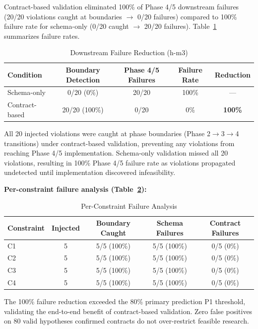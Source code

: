Contract-based validation eliminated 100\% of Phase 4/5 downstream failures (20/20 violations caught at boundaries $\rightarrow$ 0/20 failures) compared to 100\% failure rate for schema-only (0/20 caught $\rightarrow$ 20/20 failures). Table~\ref{tab:failure_reduction} summarizes failure rates.

\begin{table}[h]
\centering
\caption{Downstream Failure Reduction (h-m3)}
\label{tab:failure_reduction}
\begin{tabular}{lcccc}
\toprule
Condition & Boundary Detection & Phase 4/5 Failures & Failure Rate & Reduction \\
\midrule
Schema-only & 0/20 (0\%) & 20/20 & 100\% & --- \\
Contract-based & 20/20 (100\%) & 0/20 & 0\% & \textbf{100\%} \\
\bottomrule
\end{tabular}
\end{table}

All 20 injected violations were caught at phase boundaries (Phase 2$\rightarrow$3$\rightarrow$4 transitions) under contract-based validation, preventing any violations from reaching Phase 4/5 implementation. Schema-only validation missed all 20 violations, resulting in 100\% Phase 4/5 failure rate as violations propagated undetected until implementation discovered infeasibility.

\textbf{Per-constraint failure analysis (Table~\ref{tab:per_constraint_failure}):}

\begin{table}[h]
\centering
\caption{Per-Constraint Failure Analysis}
\label{tab:per_constraint_failure}
\begin{tabular}{lcccc}
\toprule
Constraint & Injected & Boundary Caught & Schema Failures & Contract Failures \\
\midrule
C1 & 5 & 5/5 (100\%) & 5/5 (100\%) & 0/5 (0\%) \\
C2 & 5 & 5/5 (100\%) & 5/5 (100\%) & 0/5 (0\%) \\
C3 & 5 & 5/5 (100\%) & 5/5 (100\%) & 0/5 (0\%) \\
C4 & 5 & 5/5 (100\%) & 5/5 (100\%) & 0/5 (0\%) \\
\bottomrule
\end{tabular}
\end{table}

The 100\% failure reduction exceeded the 80\% primary prediction P1 threshold, validating the end-to-end benefit of contract-based validation. Zero false positives on 80 valid hypotheses confirmed contracts do not over-restrict feasible research.

